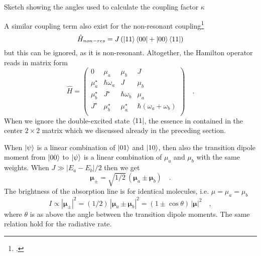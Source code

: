 \begin{marginfigure}

\caption{Sketch showing 
the angles used to calculate the coupling factor $\kappa$}
\end{marginfigure}

A similar coupling term also exist for the non-resonant coupling\footcite{knoester-book}
\begin{equation}
\hat{H}_{non-res} = J \left(  \ket{11}\bra{00} + \ket{00}\bra{11}  \right)
\end{equation}
but this can be ignored, as it is non-resonant. Altogether, the Hamilton operator reads in matrix form
\begin{equation}
\hat{H} = \begin{pmatrix}
0   					& \mu_a 						&	\mu_b						& 		J 		\\
\mu_a^\star	& \hbar \omega_a		&	J								& \mu_b	\\
\mu_b^\star  &  J^\star					& \hbar \omega_b		& \mu_a	\\
J^\star				& \mu_b^\star			& \mu_a^\star			& \hbar (\omega_a + \omega_b) \\
\end{pmatrix} \quad .
\end{equation}
When we ignore the double-excited state $\bra{11}$, the essence in contained in the center $2 \times 2$ matrix which we discussed already in the preceding section.

When $\ket{\psi}$ is a linear combination of $\ket{01}$ and $\ket{10}$, then also the transition dipole moment from $\ket{00}$ to $\ket{\psi}$ is a linear combination of $\mu_a$ and $\mu_b$ with the same weights. When $J \gg |E_a - E_b| / 2$ then we get
\begin{equation}
 \boldsymbol{\mu}_{\pm} = \sqrt{1/2} \, \left( \boldsymbol{\mu}_a \pm  \boldsymbol{\mu}_b  \right)  \quad .
\end{equation}
The brightness of the absorption line is for identical molecules, i.e. $\mu = \mu_a = \mu_b$
\begin{equation}
 I \propto |\boldsymbol{\mu}_{\pm}|^2 = (1/2) \, \left| \boldsymbol{\mu}_a \pm  \boldsymbol{\mu}_b  \right|^2 =  \left( 1 \pm \cos \theta \right) \, \left| \boldsymbol{\mu}   \right| ^2  \quad ,
\end{equation}
where $\theta$ is as above the angle between the transition dipole moments. The same relation hold for the radiative rate.

